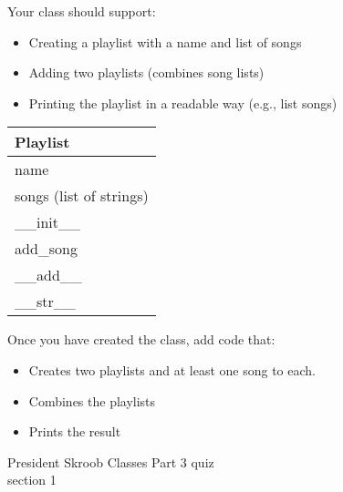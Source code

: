 \documentclass{article}
\begin{document}
\begin{enumerate}
\begin{minipage}[t]{0.65\textwidth}
			Your class should support:
			\begin{itemize}
				\item Creating a playlist with a name and list of songs
				\item Adding two playlists (combines song lists)
				\item Printing the playlist in a readable way (e.g., list songs)
			\end{itemize}	
		\end{minipage}
		\hfill
		\begin{minipage}[t]{0.32\textwidth}
			\vspace{.2em}
			\begin{flushright}
				\begin{tabular}{|l|}
					\hline
					Playlist \\ \hline
					name \\
					songs (list of strings) \\ \hline
					\_\_init\_\_ \\
					add\_song \\
					\_\_add\_\_ \\
					\_\_str\_\_ \\ \hline
				\end{tabular}
			\end{flushright}
		\end{minipage}
		
		Once you have created the class, add code that:
		\begin{itemize}
			\item Creates two playlists and at least one song to each.
			\item Combines the playlists
			\item Prints the result
		\end{itemize}



\end{enumerate}
\pagebreak
President Skroob \hfill Classes Part 3 quiz\\
section 1\\
\end{document}
